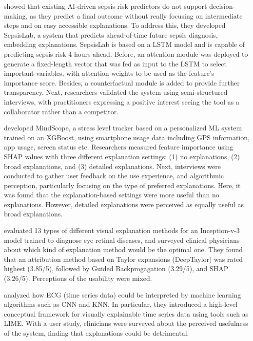 \cite{zhang2024rethinking} showed that existing AI-driven sepsis risk predictors do not support decision-making, as they predict a final outcome without really focusing on intermediate steps and on easy accessible explanations. To address this, they developed SepsisLab, a system that predicts ahead-of-time future sepsis diagnosis, embedding explanations. SepsisLab is based on a LSTM model and is capable of predicting sepsis risk 4 hours ahead. Before, an attention module was deployed to generate a fixed-length vector that was fed as input to the LSTM to select important variables, with attention weights to be used as the feature's importance score. Besides, a counterfactual module is added to provide further transparency. Next, researchers validated the system using semi-structured interviews, with practitioners expressing a positive interest seeing the tool as a collaborator rather than a competitor. 


\cite{kim2022prediction} developed MindScope, a stress level tracker based on a personalized ML system trained on an XGBoost, using smartphone usage data including GPS information, app usage, screen status etc. Researchers measured feature importance using SHAP values with three different explanation settings: (1) no explanations, (2) broad explanations, and (3) detailed explanations. Next, interviews were conducted to gather user feedback on the use experience, and algorithmic perception, particularly focusing on the type of preferred explanations. Here, it was found that the explanation-based settings were more useful than no explanations. However, detailed explanations were perceived as equally useful as broad explanations. 

\cite{singh2021evaluation} evaluated 13 types of different visual explanation methods for an Inception-v-3 model trained to diagnose eye retinal diseases, and surveyed clinical physicians about which kind of explanation method would be the optimal one. They found that an attribution method based on Taylor expansions (DeepTaylor) was rated highest (3.85/5), followed by Guided Backprogagation (3.29/5), and SHAP (3.26/5). Perceptions of the usability were mixed.  

\cite{neves2021interpretable} analyzed how ECG (time series data) could be interpreted by machine learning algorithms such as CNN and KNN. In particular, they introduced a high-level conceptual framework for visually explainable time series data using tools such as LIME. With a user study, clinicians were surveyed about the perceived usefulness of the system, finding that explanations could be detrimental. 